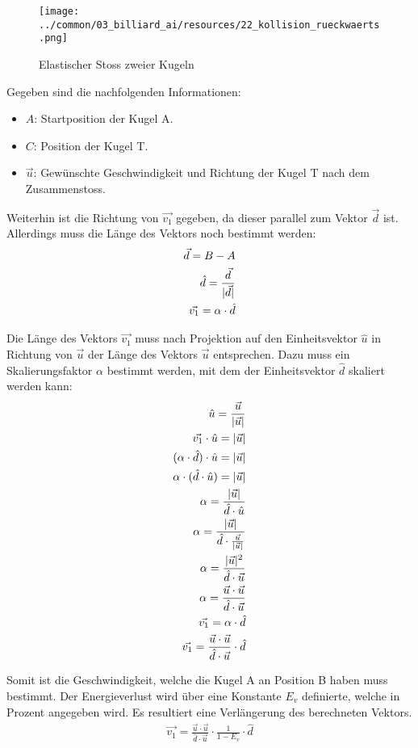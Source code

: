 \begin{figure}[h!]
    \begin{center}
        \texttt{[image: ../common/03\_billiard\_ai/resources/22\_kollision\_rueckwaerts.png]}
    \end{center}
    \caption{Elastischer Stoss zweier Kugeln}
    \label{fig:elasticCollisionOfTwoBalls}
\end{figure}

Gegeben sind die nachfolgenden Informationen:
\begin{itemize}
    \item $A$: Startposition der Kugel A.
    \item $C$: Position der Kugel T.
    \item $\vec{u}$: Gewünschte Geschwindigkeit und Richtung der Kugel T nach dem Zusammenstoss.
\end{itemize}

Weiterhin ist die Richtung von $\vec{v_1}$ gegeben, da dieser parallel zum Vektor $\vec{d}$ ist.
Allerdings muss die Länge des Vektors noch bestimmt werden:
\begin{align}
    \vec{d} = B - A\\
    \hat{d} = \frac{\vec{d}}{\lvert \vec{d} \rvert}\\
    \vec{v_1} = \alpha \cdot \hat{d}
\end{align}

Die Länge des Vektors $\vec{v_1}$ muss nach Projektion auf den Einheitsvektor $\hat{u}$ in Richtung
von $\vec{u}$ der Länge des Vektors $\vec{u}$ entsprechen. Dazu muss ein Skalierungsfaktor $\alpha$ bestimmt werden,
mit dem der Einheitsvektor $\hat{d}$ skaliert werden kann:
\begin{align}
    \hat{u} = \frac{\vec{u}}{\lvert \vec{u} \rvert}\\
    \vec{v_1} \cdot \hat{u} = \lvert \vec{u} \rvert\\
    (\alpha \cdot \hat{d}) \cdot \hat{u} = \lvert \vec{u} \rvert\\
    \alpha \cdot (\hat{d} \cdot \hat{u}) = \lvert \vec{u} \rvert\\
    \alpha = \frac{\lvert \vec{u} \rvert}{\hat{d} \cdot \hat{u}}\\
    \alpha = \frac{\lvert \vec{u} \rvert}{\hat{d} \cdot \frac{\vec{u}}{\lvert \vec{u} \rvert}}\\
    \alpha = \frac{\lvert \vec{u} \rvert^2}{\hat{d} \cdot \vec{u}}\\
    \alpha = \frac{\vec{u} \cdot \vec{u}}{\hat{d} \cdot \vec{u}}\\
    \vec{v_1} = \alpha \cdot \hat{d}\\
    \vec{v_1} = \frac{\vec{u} \cdot \vec{u}}{\hat{d} \cdot \vec{u}} \cdot \hat{d}
\end{align}

Somit ist die Geschwindigkeit, welche die Kugel A an Position B haben muss bestimmt.
Der Energieverlust wird über eine Konstante $E_v$ definierte, welche in Prozent angegeben wird.
Es resultiert eine Verlängerung des berechneten Vektors.
\begin{align}
    \vec{v_1} = \frac{\vec{u} \cdot \vec{u}}{\hat{d} \cdot \vec{u}} \cdot \frac{1}{1 - E_v} \cdot \hat{d}
\end{align}